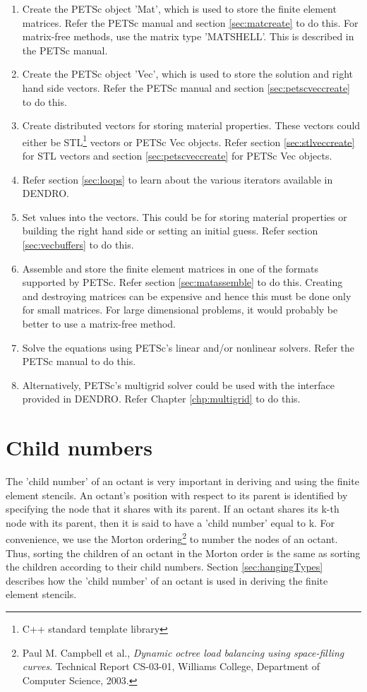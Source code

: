\documentclass[10pt,reqno,a4paper]{report}
\numberwithin{equation}{section}
\begin{document}
\begin{enumerate}
\item Create the PETSc object 'Mat', which is used to store the finite element matrices. Refer the PETSc manual and section \ref{sec:matcreate} to do this. For matrix-free methods, use the matrix type 'MATSHELL'. This is described in the PETSc manual.

\item Create the PETSc object 'Vec', which is used to store the solution and right hand side vectors. Refer the PETSc manual and section \ref{sec:petscveccreate} to do this.

\item Create distributed vectors for storing material properties. These vectors could either be STL\footnote{C++ standard template library} vectors or PETSc Vec objects. Refer section \ref{sec:stlveccreate} for STL vectors and section \ref{sec:petscveccreate} for PETSc Vec objects.

\item Refer section \ref{sec:loops} to learn about the various iterators available in DENDRO.

\item Set values into the vectors. This could be for storing material properties or building the right hand side or setting an initial guess. Refer section \ref{sec:vecbuffers} to do this.

\item Assemble and store the finite element matrices in one of the formats supported by PETSc. Refer section \ref{sec:matassemble} to do this. Creating and destroying matrices can be expensive and hence this must be done only for small matrices. For large dimensional problems, it would probably be better to use a matrix-free method.

\item Solve the equations using PETSc's linear and/or nonlinear solvers. Refer the PETSc manual to do this.

\item Alternatively, PETSc's multigrid solver could be used with the interface provided in DENDRO. Refer Chapter \ref{chp:multigrid} to do this.
\end{enumerate}

\section{Child numbers}
\label{sec:childNumber}
The 'child number' of an octant is very important in deriving and using the finite element stencils. An octant's position with respect to its parent is identified by specifying the node that it shares with its parent. If an octant shares its k-th node with its parent, then it is said to have a 'child number' equal to k. For convenience, we use the Morton ordering\footnote{Paul M. Campbell et al., \textit{Dynamic octree load balancing using space-filling curves}. Technical Report CS-03-01, Williams College, Department of Computer Science, 2003.} to number the nodes of an octant. Thus, sorting the children of an octant in the Morton order is the same as sorting the children according to their child numbers. Section \ref{sec:hangingTypes} describes how the 'child number' of an octant is used in deriving the finite element stencils.
\end{document}
